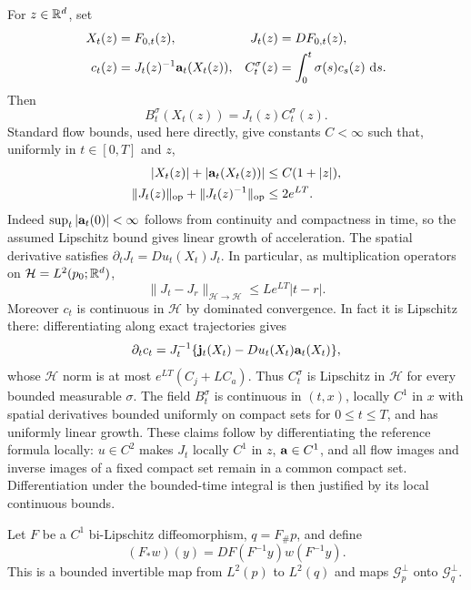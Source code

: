 For $z\in\mathbb R^d$, set
\begin{align*}
 X_t(z)&=F_{0,t}(z),& J_t(z)&=DF_{0,t}(z),\\
 c_t(z)&=J_t(z)^{-1}\mathbf a_t(X_t(z)),&
 C_t^\sigma(z)&=\int_0^t\sigma(s)c_s(z)\,\,\mathrm d s.
\end{align*}
Then
\begin{equation}
 B_t^\sigma(X_t(z))=J_t(z)C_t^\sigma(z).
 \label{eq:global-reference-defect}
\end{equation}
Standard flow bounds, used here directly, give constants $C<\infty$
such that, uniformly in $t\in[0,T]$ and $z$,
\begin{align}
 |X_t(z)|+|\mathbf a_t(X_t(z))|&\le C(1+|z|),\nonumber\\
 \|J_t(z)\|_{\rm op}+\|J_t(z)^{-1}\|_{\rm op}&\le2e^{LT}.
 \label{eq:global-flow-growth}
\end{align}
Indeed $\sup_t|\mathbf a_t(0)|<\infty$ follows from continuity and compactness
in time, so the assumed Lipschitz bound gives linear growth of
acceleration.  The spatial derivative satisfies
$\partial_tJ_t=Du_t(X_t)J_t$.  In particular, as multiplication
operators on $\mathcal H=L^2(p_0;\mathbb R^d)$,
\begin{equation}
 \|J_t-J_r\|_{\mathcal H\to\mathcal H}
 \le Le^{LT}|t-r|.
 \label{eq:jacobian-operator-continuity}
\end{equation}
Moreover $c_t$ is continuous in $\mathcal H$ by dominated convergence.
In fact it is Lipschitz there: differentiating along exact trajectories
gives
\[
 \partial_tc_t
 =J_t^{-1}\{\mathbf j_t(X_t)-Du_t(X_t)\mathbf a_t(X_t)\},
\]
whose $\mathcal H$ norm is at most $e^{LT}(C_j+LC_a)$.  Thus
$C_t^\sigma$ is Lipschitz in $\mathcal H$ for every bounded measurable
$\sigma$.  The field $B_t^\sigma$ is continuous in $(t,x)$, locally
$C^1$ in $x$ with spatial derivatives bounded uniformly on compact
sets for $0\le t\le T$, and has uniformly linear growth.  These claims
follow by differentiating the reference formula locally: $u\in C^2$
makes $J_t$ locally $C^1$ in $z$, $\mathbf a\in C^1$, and all flow images
and inverse images of a fixed compact set remain in a common compact
set.  Differentiation under the bounded-time integral is then justified
by its local continuous bounds.

\begin{lemma}
\label{lem:global-solenoidal-transport}
Let $F$ be a $C^1$ bi-Lipschitz diffeomorphism, $q=F_\#p$, and define
\[
 (F_*w)(y)=DF(F^{-1}y)w(F^{-1}y).
\]
This is a bounded invertible map from $L^2(p)$ to $L^2(q)$ and maps
$\mathcal G_p^\perp$ onto $\mathcal G_q^\perp$.
\end{lemma}

